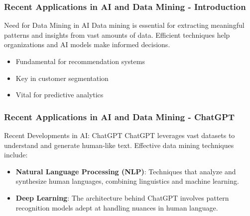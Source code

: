 \documentclass[aspectratio=169]{beamer}
\begin{document}
\begin{frame}[fragile]
  \frametitle{Recent Applications in AI and Data Mining - Introduction}
  \begin{block}{Need for Data Mining in AI}
    Data mining is essential for extracting meaningful patterns and insights from vast amounts of data. 
    Efficient techniques help organizations and AI models make informed decisions.
    
    \begin{itemize}
      \item Fundamental for recommendation systems
      \item Key in customer segmentation
      \item Vital for predictive analytics
    \end{itemize}
  \end{block}
\end{frame}

\begin{frame}[fragile]
  \frametitle{Recent Applications in AI and Data Mining - ChatGPT}
  \begin{block}{Recent Developments in AI: ChatGPT}
    ChatGPT leverages vast datasets to understand and generate human-like text.
    Effective data mining techniques include:
    
    \begin{itemize}
      \item \textbf{Natural Language Processing (NLP)}: 
      Techniques that analyze and synthesize human languages, combining linguistics and machine learning.
      
      \item \textbf{Deep Learning}: 
      The architecture behind ChatGPT involves pattern recognition models adept at handling nuances in human language.
    \end{itemize}
  \end{block}
\end{frame}
\end{document}
